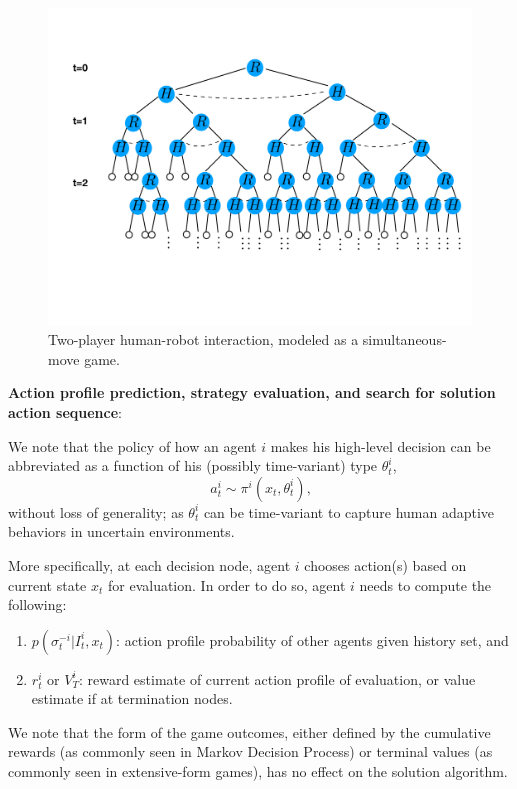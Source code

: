 \documentclass[letterpaper, 10 pt, conference]{ieeeconf}  %
\begin{document}
\begin{figure}[t]
	\centering
	\vspace{-3em}
	\includegraphics[scale=0.21]{game_tree}
	\vspace{-5em}
	\caption{Two-player human-robot interaction, modeled as a 
		simultaneous-move game. }
	\vspace{-1.4em}
	\label{fig:game_tree}
\end{figure}

\textbf{Action profile prediction, strategy evaluation, and search for 
solution action sequence}:

We note that the policy of how an agent $i$ makes his high-level decision can 
be abbreviated as a function of his (possibly time-variant) type $\theta^i_t$,
\begin{equation}~\label{eq:pi}
a^i_t \sim \pi^i(x_t,\theta^i_t),
\end{equation}
without loss of generality; as $\theta^i_t$ can be time-variant to capture 
human adaptive behaviors in uncertain environments.  

More specifically, at each decision node, agent $i$ chooses action(s) based on 
current state $x_t$ for evaluation. In order to do so, agent $i$ needs to 
compute the following:
\begin{enumerate}
  \item $p(\sigma^{-i}_t|I^i_t,x_t)$: action profile probability of other 
    agents given history set, and
  \item $r^i_t$ or $V^i_T$: 
    reward estimate of current action profile of evaluation, or value estimate 
    if at termination nodes.
\end{enumerate}
We note that the form of the game outcomes, either defined by the cumulative 
rewards (as commonly seen in Markov Decision Process) or terminal values (as 
commonly seen in extensive-form games), has no effect on the solution algorithm. 
\end{document}
